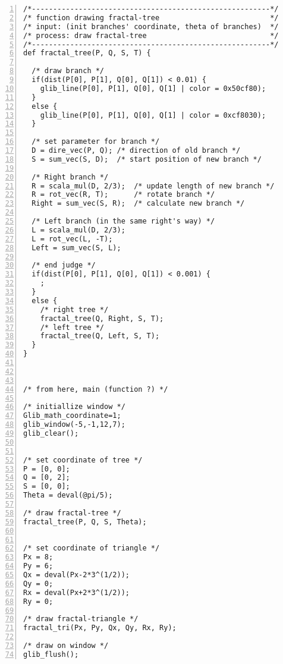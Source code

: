 \documentclass[a4j]{jarticle}
\begin{document}
\begin{lstlisting}[caption=2つのフラクタル図形を作図するプログラム, tabsize = 2, basicstyle=\footnotesize, frame=single, numbers=left, breaklines=true]
/*--------------------------------------------------------*/
/* function drawing fractal-tree                          */
/* input: (init branches' coordinate, theta of branches)  */
/* process: draw fractal-tree                             */
/*--------------------------------------------------------*/
def fractal_tree(P, Q, S, T) {

  /* draw branch */
  if(dist(P[0], P[1], Q[0], Q[1]) < 0.01) {
    glib_line(P[0], P[1], Q[0], Q[1] | color = 0x50cf80);
  }
  else {
    glib_line(P[0], P[1], Q[0], Q[1] | color = 0xcf8030);
  }

  /* set parameter for branch */
  D = dire_vec(P, Q); /* direction of old branch */
  S = sum_vec(S, D);  /* start position of new branch */
  
  /* Right branch */
  R = scala_mul(D, 2/3);  /* update length of new branch */
  R = rot_vec(R, T);      /* rotate branch */
  Right = sum_vec(S, R);  /* calculate new branch */
  
  /* Left branch (in the same right's way) */
  L = scala_mul(D, 2/3);
  L = rot_vec(L, -T);
  Left = sum_vec(S, L);

  /* end judge */
  if(dist(P[0], P[1], Q[0], Q[1]) < 0.001) {
    ;
  }
  else {
    /* right tree */
    fractal_tree(Q, Right, S, T);
    /* left tree */
    fractal_tree(Q, Left, S, T);
  }
}



/* from here, main (function ?) */

/* initiallize window */
Glib_math_coordinate=1;
glib_window(-5,-1,12,7);
glib_clear();


/* set coordinate of tree */
P = [0, 0];
Q = [0, 2];
S = [0, 0];
Theta = deval(@pi/5);

/* draw fractal-tree */
fractal_tree(P, Q, S, Theta);


/* set coordinate of triangle */
Px = 8;
Py = 6;
Qx = deval(Px-2*3^(1/2));
Qy = 0;
Rx = deval(Px+2*3^(1/2));
Ry = 0;

/* draw fractal-triangle */
fractal_tri(Px, Py, Qx, Qy, Rx, Ry);

/* draw on window */
glib_flush();
\end{lstlisting}
\end{document}
